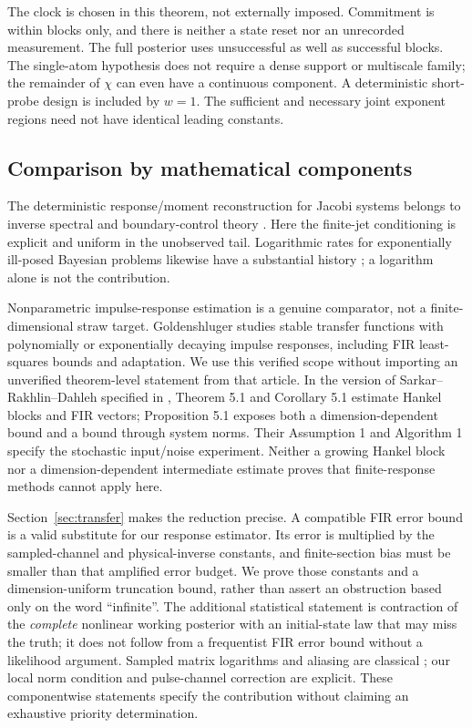 The clock is chosen in this theorem, not externally imposed. Commitment is
within blocks only, and there is neither a state reset nor an unrecorded
measurement. The full posterior uses unsuccessful as well as successful blocks.
The single-atom hypothesis does not require a dense support or multiscale family;
the remainder of $\chi$ can even have a continuous component. A deterministic
short-probe design is included by $w=1$. The sufficient and necessary joint
exponent regions need not have identical leading constants.

\subsection{Comparison by mathematical components}
The deterministic response/moment reconstruction for Jacobi systems belongs
to inverse spectral and boundary-control theory \cite{Teschl,MM2019,MM2020}.
Here the finite-jet conditioning is explicit and uniform in the unobserved
tail. Logarithmic rates for exponentially ill-posed Bayesian problems likewise
have a substantial history \cite{ASZ2014}; a logarithm alone is not the contribution.

Nonparametric impulse-response estimation is a genuine comparator, not a
finite-dimensional straw target. Goldenshluger \cite{Gold1998} studies stable
transfer functions with polynomially or exponentially decaying impulse
responses, including FIR least-squares bounds and adaptation. We use this
verified scope without importing an unverified theorem-level statement from
that article. In the version of Sarkar--Rakhlin--Dahleh specified in
\cite{SRD2020}, Theorem 5.1 and Corollary 5.1 estimate Hankel blocks and FIR
vectors; Proposition 5.1 exposes both a dimension-dependent bound and a bound
through system norms. Their Assumption 1 and Algorithm 1 specify the stochastic
input/noise experiment. Neither a growing Hankel block nor a dimension-dependent
intermediate estimate proves that finite-response methods cannot apply here.

Section~\ref{sec:transfer} makes the reduction precise. A compatible FIR error
bound is a valid substitute for our response estimator. Its error is multiplied
by the sampled-channel and physical-inverse constants, and finite-section bias
must be smaller than that amplified error budget. We prove those constants
and a dimension-uniform truncation bound, rather than assert an obstruction
based only on the word ``infinite''. The additional statistical statement is
contraction of the \emph{complete} nonlinear working posterior with an
initial-state law that may miss the truth; it does not follow from a frequentist
FIR error bound without a likelihood argument. Sampled matrix logarithms and
aliasing are classical \cite{YTG2016}; our local norm condition and pulse-channel
correction are explicit. These componentwise statements specify the contribution
without claiming an exhaustive priority determination.

